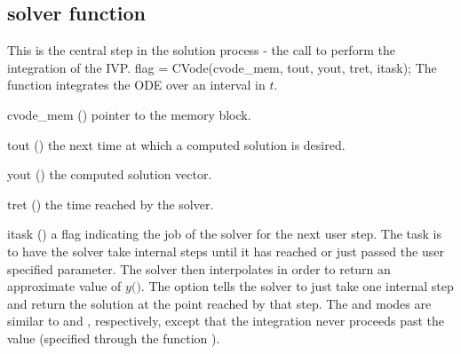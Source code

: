 
\subsection{{\cvodes} solver function}\label{sss:cvode}
%
This is the central step in the solution process - the call to perform the integration 
of the IVP.
%
{
  flag = CVode(cvode\_mem, tout, yout, tret, itask);
}
{
  The function  integrates the ODE over an interval in $t$.
}
{
  \begin{args}
  \item[cvode\_mem] ()
    pointer to the {\cvodes} memory block.
  \item[tout] ()
    the next time at which a computed solution is desired.
  \item[yout] ()
    the computed solution vector.
  \item[tret] ()
    the time reached by the solver.
  \item[itask] ()
    a flag indicating the job of the solver for the next user step. 
    The  task is to have the solver take internal steps until   
    it has reached or just passed the user specified 
    parameter. The solver then interpolates in order to   
    return an approximate value of $y($$)$. 
    The  option tells the solver to just take one internal step  
    and return the solution at the point reached by that step. 
    The  and  modes are     
    similar to  and , respectively, except    
    that the integration never proceeds past the value      
     (specified through the function ).
  \end{args}
}
